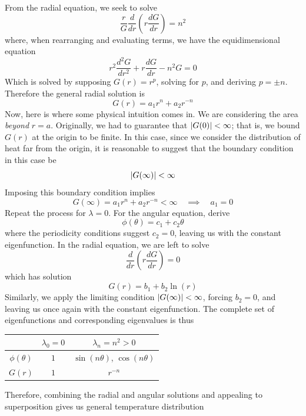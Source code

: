 \documentclass[a4paper]{article}
\begin{document}
From the radial equation, we seek to solve
\[
	\frac{r}{G}\frac{d }{d r}\!\left( r \frac{d G}{d r} \right) = n^{2} 
\]
where, when rearranging and evaluating terms, we have the equidimensional equation
\[
	r^{2}\frac{d^2 G}{d r^2} + r \frac{d G}{d r} - n^{2}G = 0 
\]
Which is solved by supposing \( G \!\left( r \right) = r^{p} \), solving for \( p \), and deriving \( p = \pm n \). Therefore the general radial solution is
\[
	G \!\left( r \right) = a_{1}r^{n} + a_{2}r^{-n} 
\]
Now, here is where some physical intuition comes in. We are considering the area \textit{beyond} \( r = a \). Originally, we had to guarantee that \( \abs{G \!\left( 0 \right)} < \infty \); that is, we bound \( G \!\left( r \right) \) at the origin to be finite. In this case, since we consider the distribution of heat far from the origin, it is reasonable to suggest that the boundary condition in this case be 
\[
	\abs{G \!\left( \infty \right)} < \infty
\]
Imposing this boundary condition implies
\[
	G \!\left( \infty \right) = a_{1}r^{n} + a_{2}r^{-n} < \infty \quad \implies \quad a_{1} = 0 
\]
Repeat the process for \( \lambda = 0 \). For the angular equation, derive
\[
	\phi \!\left( \theta \right) = c_{1} + c_{2}\theta 
\]
where the periodicity conditions suggest \( c_{2} = 0 \), leaving us with the constant eigenfunction. In the radial equation, we are left to solve
\[
	\frac{d }{d r}\!\left( r \frac{d G}{d r} \right) = 0 
\]
which has solution
\[
	G \!\left( r \right) = b_{1} + b_{2}\ln\!\left(r\right) 
\]
Similarly, we apply the limiting condition \( \abs{G \!\left( \infty \right)} < \infty \), forcing \( b_{2} = 0 \), and leaving us once again with the constant eigenfunction. The complete set of eigenfunctions and corresponding eigenvalues is thus
\begin{center}
	\renewcommand{\arraystretch}{1.8}
	\setlength{\arraycolsep}{10pt}
	\begin{tabular}{|c||c|c|}
		\hline
		\rule[-1.2em]{0pt}{3em}
		 & \( \lambda_{0} = 0 \) & \( \lambda_{n} = n^{2} > 0 \) \\
		\hline\hline
		\rule[-1.2em]{0pt}{3em}
				\( \phi \!\left( \theta \right) \) & \( 1 \) & \( \sin\!\left(n \theta\right) \), \( \cos\!\left(n \theta\right) \) \\
		\hline
		\rule[-1.2em]{0pt}{3em}
				\( G \!\left( r \right) \) & \( 1 \) & \( r^{-n} \) \\
		\hline
	\end{tabular}
\end{center}
Therefore, combining the radial and angular solutions and appealing to superposition gives us general temperature distribution
\end{document}

